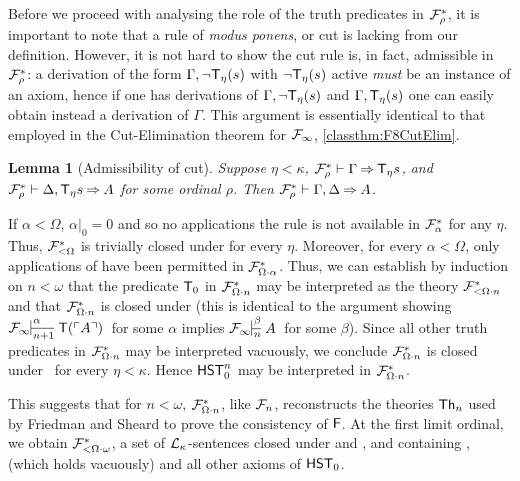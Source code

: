 \documentclass[UKenglish,cleveref,DIV=12]{scrartcl}
\newtheorem{lemma}{Lemma}
\theoremstyle{definition}
\theoremstyle{definition}
\begin{document}
Before we proceed with analysing the role of the truth predicates in
$\mathcal{F}^*_\rho$, it is important to note that a rule of {\em modus ponens}, or cut
is lacking from our definition. However, it is not hard to show the cut rule is,
in fact, admissible in $\mathcal{F}^*_\rho$: a derivation of
the form $\Gamma,\lnot \mathsf{T}_\eta(s)$ with $\lnot\mathsf{T}_\eta(s)$ active {\em must} be an
instance of an axiom, hence if one has derivations of $\Gamma,\lnot \mathsf{T}_\eta(s)$
and $\Gamma,\mathsf{T}_\eta(s)$ one can easily obtain instead a derivation of $\Gamma$.
This argument is essentially identical to that employed in the Cut-Elimination
theorem for $\mathcal{F}_\infty$, \cref{classthm:F8CutElim}.
\begin{lemma}[Admissibility of cut]\label{extthm:FFCutElim}
 Suppose $\eta<\kappa$, $\mathcal{F}^*_\rho\vdash\Gamma \mathbin\Rightarrow \mathsf{T}_\eta s $, and $\mathcal{F}^*_\rho\vdash\Delta,
  \mathsf{T}_\eta s  \mathbin\Rightarrow A $ for some ordinal $\rho$. Then $\mathcal{F}^*_\rho\vdash\Gamma,\Delta \mathbin\Rightarrow A$.
\end{lemma}

If $\alpha<\Omega$, $\alpha|_0=0$ and so no applications the rule \Nec\eta is not available in $\mathcal{F}^*_\alpha$ for any $\eta$. Thus, $\mathcal{F}^*_{\mathord<\Omega}$ is trivially closed under \Conec\eta for every $\eta$. Moreover, for every
$\alpha<\Omega$, only applications of  have been permitted in $\mathcal{F}^*_{\Omega\cdot\alpha}$. Thus, we can
establish by induction on $n<\omega$ that the predicate $\mathsf{T}_0$ in $\mathcal{F}^*_{\Omega\cdot n}$ may be interpreted as the
theory $\mathcal{F}^*_{<\Omega\cdot n}$ and that $\mathcal{F}^*_{\Omega\cdot n}$ is closed under  (this is identical to the argument showing $\Finfty\prov\alpha {n+1}{\T(\gn A)}$ for some $\alpha$ implies $\Finfty\prov\beta n A$ for some $\beta$). Since all other truth
predicates in $\mathcal{F}^*_{\Omega\cdot n}$ may be interpreted vacuously, we conclude $\mathcal{F}^*_{\Omega\cdot n}$ is closed under
\Conec\eta\ for every $\eta<\kappa$. 
Hence $\mathsf{HST}_0^n$ may be interpreted
in $\mathcal{F}^*_{\Omega\cdot n}$.

This suggests that for $n<\omega$, $\mathcal{F}^*_{\Omega\cdot n}$, like $\mathcal{F}_n$, reconstructs
the theories $\mathsf{Th}_n$ used by Friedman and Sheard to prove the consistency of
$\mathsf{F}$. At the first limit ordinal,
we obtain $\mathcal{F}^*_{<\Omega\cdot\omega}$, a set of $\mathcal{L}_\kappa$-sentences closed under
 and , and containing ,  (which holds vacuously) and all other axioms of $\mathsf{HST}_0$.
\end{document}
